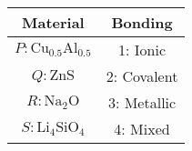 
\begin{tabular}{|c|c|}
		\hline
		\textbf{Material} & \textbf{Bonding} \\
		\hline
		$P: \text{Cu}_{0.5} \text{Al}_{0.5}$ & 1: Ionic \\
		\hline 
		$Q: \text{ZnS}$ & 2: Covalent \\
		\hline
		$R: \text{Na}_2 \text{O}$ & 3: Metallic \\
		\hline
		$S: \text{Li}_4\text{SiO}_4$ & 4: Mixed \\
		\hline
\end{tabular}
